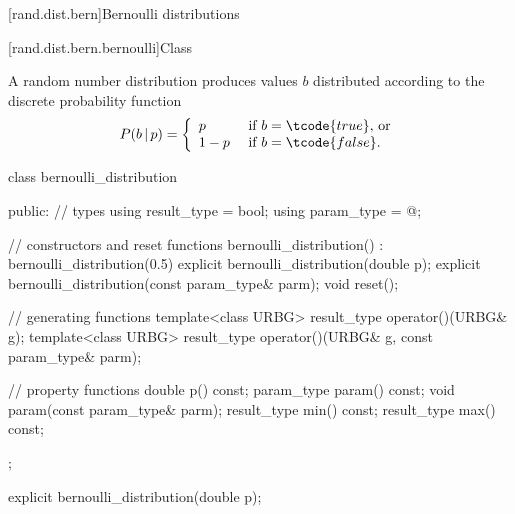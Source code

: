 
[rand.dist.bern]{Bernoulli distributions}%
%
%


[rand.dist.bern.bernoulli]{Class }%
%
%

\pnum
A  random number distribution
produces  values $b$
distributed according to
the discrete probability function
%
%
\[  P(b\,|\,p) = \left\{ \begin{array}{ll}
                          p     & \text{ if $b = \tcode{true}$, or} \\
                          1 - p & \text{ if $b = \tcode{false}$.}
                          \end{array}\right.
\]

%
%
\begin{codeblock}
class bernoulli_distribution {
public:
  // types
  using result_type = bool;
  using param_type  = @\unspec@;

  // constructors and reset functions
  bernoulli_distribution() : bernoulli_distribution(0.5) {}
  explicit bernoulli_distribution(double p);
  explicit bernoulli_distribution(const param_type& parm);
  void reset();

  // generating functions
  template<class URBG>
    result_type operator()(URBG& g);
  template<class URBG>
    result_type operator()(URBG& g, const param_type& parm);

  // property functions
  double p() const;
  param_type param() const;
  void param(const param_type& parm);
  result_type min() const;
  result_type max() const;
};
\end{codeblock}


%
\begin{itemdecl}
explicit bernoulli_distribution(double p);
\end{itemdecl}

